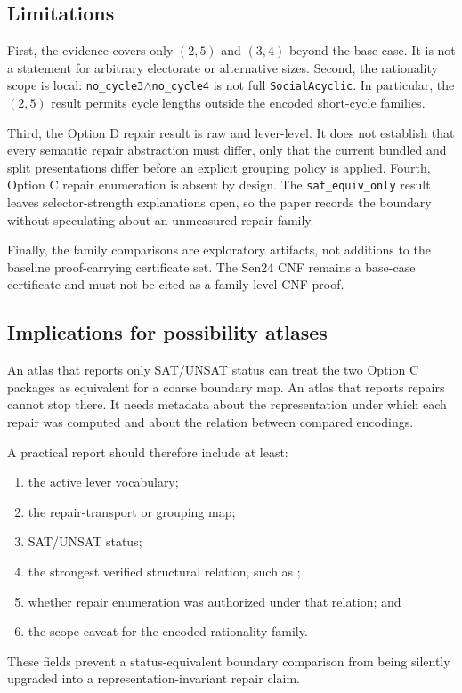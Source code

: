 \subsection{Limitations}

First, the evidence covers only $(2,5)$ and $(3,4)$ beyond the base case.  It is
not a statement for arbitrary electorate or alternative sizes.
Second, the rationality scope is local:
\texttt{no\_cycle3}$\wedge$\texttt{no\_cycle4} is not full
\texttt{SocialAcyclic}.  In particular, the $(2,5)$ result permits cycle lengths
outside the encoded short-cycle families.

Third, the Option D repair result is raw and lever-level.  It does not establish
that every semantic repair abstraction must differ, only that the current
bundled and split presentations differ before an explicit grouping policy is
applied.  Fourth, Option C repair enumeration is absent by design.  The
\texttt{sat\_equiv\_only} result leaves selector-strength explanations open, so
the paper records the boundary without speculating about an unmeasured repair
family.

Finally, the family comparisons are exploratory artifacts, not additions to the
baseline proof-carrying certificate set.  The Sen24 CNF remains a base-case
certificate and must not be cited as a family-level CNF proof.

\subsection{Implications for possibility atlases}

An atlas that reports only SAT/UNSAT status can treat the two Option C packages
as equivalent for a coarse boundary map.  An atlas that reports repairs cannot
stop there.  It needs metadata about the representation under which each repair
was computed and about the relation between compared encodings.

A practical report should therefore include at least:
\begin{enumerate}
  \item the active lever vocabulary;
  \item the repair-transport or grouping map;
  \item SAT/UNSAT status;
  \item the strongest verified structural relation, such as \CM;
  \item whether repair enumeration was authorized under that relation; and
  \item the scope caveat for the encoded rationality family.
\end{enumerate}
These fields prevent a status-equivalent boundary comparison from being
silently upgraded into a representation-invariant repair claim.

